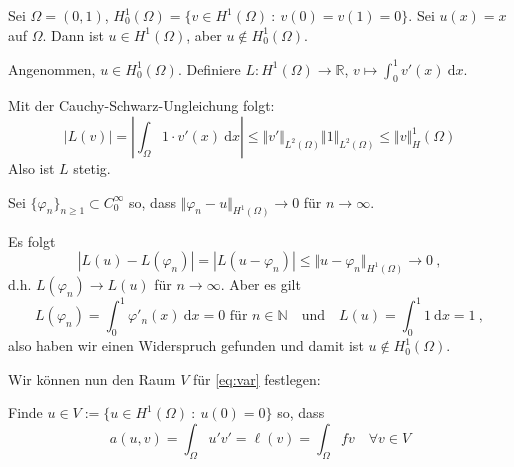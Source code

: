 \begin{bsp}
    Sei $\Omega = (0,1)$,  $H_0^1(\Omega) = \{ v \in H^1(\Omega) \ : \ v(0) = v(1) = 0 \}.$
    Sei $u(x) = x$ auf $\Omega$. Dann ist $u \in H^1(\Omega)$, aber $u \notin H_0^1(\Omega)$.

    Angenommen, $u \in H_0^1(\Omega)$. 
    Definiere $L: H^1(\Omega) \to \mathbb R$, $v \mapsto \int_0^1 v'(x) \ \mathrm dx$.
    
    Mit der Cauchy-Schwarz-Ungleichung folgt:
    \[
        |L(v)| = \left| \int_\Omega 1 \cdot v'(x) \ \mathrm dx \right|
            \leq \Vert v' \Vert_{L^2(\Omega)} \Vert 1 \Vert_{L^2(\Omega)}
            \leq \Vert v \Vert_H^1(\Omega)
    \]
    Also ist $L$ stetig.

    Sei $\{ \varphi_n \}_{n\geq 1} \subset C_0^\infty$ so, dass 
    $\Vert \varphi_n - u \Vert_{H^1(\Omega)} \to 0$ für $n \to \infty$.

    Es folgt
    \[ 
        |L(u) - L(\varphi_n) | = | L(u - \varphi_n) | \leq \Vert u - \varphi_n \Vert_{H^1(\Omega)} \to 0 \ ,
    \]
    d.h. $L(\varphi_n) \to L(u)$ für $n \to \infty$.
    Aber es gilt
    \[
        L(\varphi_n) = \int_0^1 \varphi'_n(x) \ \mathrm dx = 0 \text{ für } n \in \mathbb N \quad \text{und} \quad
        L(u) = \int_0^1 1 \ \mathrm dx = 1 \ ,
    \]
    also haben wir einen Widerspruch gefunden und damit ist $u \notin H_0^1(\Omega)$.
\end{bsp}

Wir können nun den Raum $V$ für \eqref{eq:var} festlegen:

Finde $u \in V := \{u \in H^1(\Omega) \ : \ u(0) = 0 \}$ so, dass
\[
    a(u,v) = \int_\Omega u' v' = \ell(v) = \int_\Omega f v \quad \forall v \in V
\]
